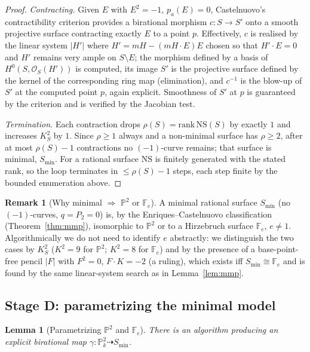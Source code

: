 \documentclass{amsart}
\theoremstyle{plain}
\newtheorem{lemma}{Lemma}
\theoremstyle{definition}
\newtheorem{remark}{Remark}
\newcommand{\PP}{\mathbb{P}}
\newcommand{\cO}{\mathcal{O}}
\begin{document}
\begin{proof}
\emph{Contracting.}  Given $E$ with $E^2=-1$, $p_a(E)=0$, Castelnuovo's
contractibility criterion provides a birational morphism $c\colon S\to S'$ onto a
smooth projective surface contracting exactly $E$ to a point $p$.  Effectively,
$c$ is realised by the linear system $|H'|$ where $H'=mH-(mH\cdot E)E$ chosen so
that $H'\cdot E=0$ and $H'$ remains very ample on $S\setminus E$; the morphism
defined by a basis of $H^0(S,\cO_S(H'))$ is computed, its image $S'$ is the
projective surface defined by the kernel of the corresponding ring map
(elimination), and $c^{-1}$ is the blow-up of $S'$ at the computed point $p$,
again explicit.  Smoothness of $S'$ at $p$ is guaranteed by the criterion and is
verified by the Jacobian test.

\emph{Termination.}  Each contraction drops $\rho(S)=\mathrm{rank}\,
\mathrm{NS}(S)$ by exactly $1$ and increases $K_S^2$ by $1$.  Since $\rho\ge1$
always and a non-minimal surface has $\rho\ge2$, after at most
$\rho(S)-1$ contractions no $(-1)$-curve remains; that surface is minimal,
$S_{\min}$.  For a rational surface $\mathrm{NS}$ is finitely generated with the
stated rank, so the loop terminates in $\le\rho(S)-1$ steps, each step finite by
the bounded enumeration above.
\end{proof}

\begin{remark}[Why minimal $\Rightarrow$ $\PP^2$ or $\mathbb F_e$]
A minimal rational surface $S_{\min}$ (no $(-1)$-curves, $q=P_2=0$) is, by the
Enriques--Castelnuovo classification (Theorem~\ref{thm:mmp}), isomorphic to
$\PP^2$ or to a Hirzebruch surface $\mathbb F_e$, $e\ne1$.  Algorithmically we do
not need to identify $e$ abstractly: we distinguish the two cases by $K_S^2$
($K^2=9$ for $\PP^2$; $K^2=8$ for $\mathbb F_e$) and by the presence of a base-point-free
pencil $|F|$ with $F^2=0$, $F\cdot K=-2$ (a ruling), which exists iff
$S_{\min}\cong\mathbb F_e$ and is found by the same linear-system search as in
Lemma~\ref{lem:mmp}.
\end{remark}

\subsection{Stage D: parametrizing the minimal model}

\begin{lemma}[Parametrizing $\PP^2$ and $\mathbb F_e$]\label{lem:param-min}
There is an algorithm producing an explicit birational map
$\gamma\colon\PP^2_k\dashrightarrow S_{\min}$.
\end{lemma}
\end{document}
